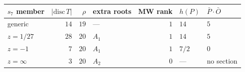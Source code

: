 \begin{tabular}{lrrlrll}
\toprule
$s_7$ member & $|\mathrm{disc}\,T|$ & $\rho$ & extra roots & MW rank & $h(P)$ & $\bar P\cdot\bar O$ \\
\midrule
generic & $14$ & $19$ & --- & $1$ & $14$ & $5$ \\
$z=1/27$ & $28$ & $20$ & $A_{1}$ & $1$ & $14$ & $5$ \\
$z=-1$ & $7$ & $20$ & $A_{1}$ & $1$ & $7/2$ & $0$ \\
$z=\infty$ & $3$ & $20$ & $A_{2}$ & $0$ & --- & no section \\
\bottomrule
\end{tabular}
